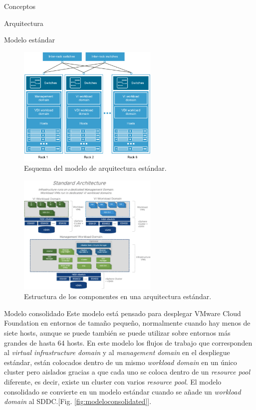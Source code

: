 \begin{section}{Conceptos}
\begin{subsection}{Arquitectura}
\begin{subsubsection}{Modelo estándar}
\begin{figure}[h!]
  \centering
  \includegraphics[width=0.6\textwidth]{imaxes/conceptosPrevios/arquitect_standarCF.png}
  \caption{Esquema del modelo de arquitectura estándar.}
  \label{fig:modelostandard}
\end{figure}

\begin{figure}[h!]
  \centering
  \includegraphics[width=0.6\textwidth]{imaxes/conceptosPrevios/standardArch.png}
  \caption{Estructura de los componentes en una arquitectura estándar.}
  \label{fig:standardarch}
\end{figure}
\FloatBarrier
\end{subsubsection}
\begin{subsubsection}{Modelo consolidado}
Este modelo está pensado para desplegar VMware Cloud Foundation en entornos de tamaño pequeño, normalmente cuando hay menos de siete hosts, aunque se puede también se puede utilizar sobre entornos más grandes de hasta 64 hosts. En este modelo los flujos de trabajo que corresponden al \textit{virtual infrastructure domain} y al \textit{management domain} en el despliegue estándar, están colocados dentro de un mismo \textit{workload domain} en un único cluster pero aislados gracias a que cada uno se coloca dentro de un \textit{resource pool} diferente, es decir, existe un cluster con varios \textit{resource pool}. El modelo consolidado se convierte en un modelo estándar cuando se añade un \textit{workload domain} al SDDC.[Fig. \ref{fig:modeloconsolidated}].


\end{subsubsection}
\end{subsection}
\end{section}
